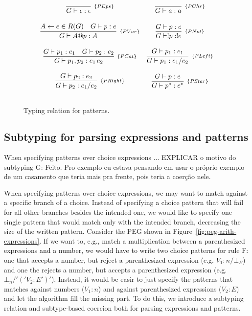 \begin{figure}[H]
  \[
    \begin{array}{cc}
      \infer[_{\{PEps\}}]{G \vdash \epsilon : \epsilon}{} &
      \infer[_{\{PChr\}}]{G\vdash a : a}{} \\ \\
      \infer[_{\{PVar\}}]{ G \vdash A@p : A}
                      {A \leftarrow e \in R(G) & G\vdash p : e} &
      \infer[_{\{PNot\}}]{G\vdash !p: ! e}{G\vdash p : e}\\ \\
      \infer[_{\{PCat\}}]{G\vdash p_1, p_2 : e_1\,e_2}
                      {G\vdash  p_1 : e_1 & G\vdash p_2 : e_2} &
      \infer[_{\{PLeft\}}]{G\vdash p_1 : e_1 / e_2}
                       {G\vdash p_1 : e_1} \\ \\
      \infer[_{\{PRight\}}]{G\vdash p_2 : e_1 / e_2}
                       {G\vdash p_2 : e_2} &
      \infer[_{\{PStar\}}]{G \vdash  p^ * : e^*}{G \vdash p : e}\\ \\
   \end{array}
  \]
  \centering
  \caption{Typing relation for patterns.}
  \label{fig:pattern-typing}
\end{figure}

\subsection{Subtyping for parsing expressions and patterns}

When specifying patterns over choice expressions ... EXPLICAR o motivo do subtyping
G: Feito. Pro exemplo eu estava pensando em usar o próprio exemplo de um casamento
que teria mais pra frente, pois teria a coerção nele.

When specifying patterns over choice expressions, we may want to match against 
a specific branch of a choice. Instead of specifying a choice pattern that will 
fail for all other branches besides the intended one, we would like to specify 
one single pattern that would match only with the intended branch, decreasing 
the size of the written pattern. 
Consider the PEG shown in Figure~\ref{fig:peg-arith-expressions}. If we want to, 
e.g., match a multiplication between a parenthesized expressions and a number, 
we would have to write two choice patterns for rule F: one that accepts a number, 
but reject a parenthesized expression (e.g. \(V_1:n / \bot_E\)) and one the rejects 
a number, but accepts a parenthesized expression (e.g. \(\bot_n / '(' V_2:E ')'\)).
Instead, it would be easir to just specify the patterns that matches against numbers
(\(V_1:n\)) and against parenthesized expressions (\(V_2:E\)) and let the algorithm
fill the missing part.
To do this, we introduce a subtyping relation and subtype-based coercion both 
for parsing expressions and patterns.


